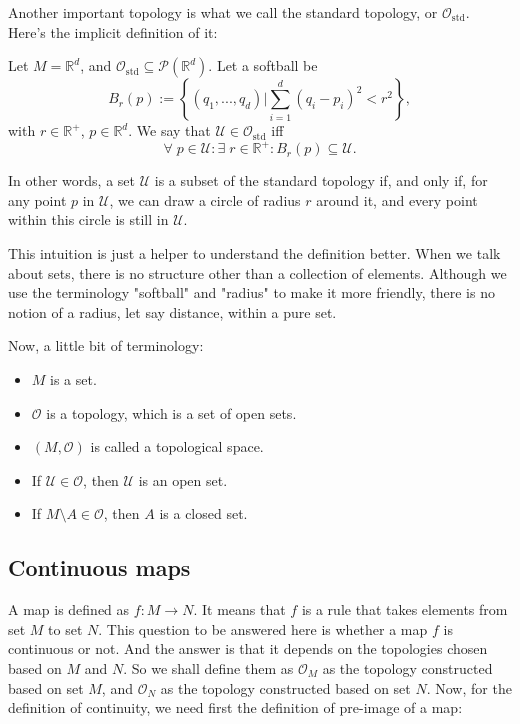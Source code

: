 \begin{example}
    Another important topology is what we call the standard topology, or $\mathcal{O}_{\text{std}}$. Here's the implicit definition of it:

    \begin{definition}
        Let $M = \mathbb{R}^d$, and $\mathcal{O}_{\text{std}} \subseteq \mathcal{P}(\mathbb{R}^d)$. 
        Let a softball be 
        \[
            B_r(p) := \left\{ (q_1, ..., q_d) \Big| \sum_{i=1}^d (q_i - p_i)^2 < r^2 \right\} ,
        \]
        with $r \in \mathbb{R}^+$, $p \in \mathbb{R}^d$. We say that $\mathcal{U} \in \mathcal{O}_{\text{std}}$ iff
        \[
            \forall \; p \in \mathcal{U}: \exists \; r \in \mathbb{R}^+ : B_r (p) \subseteq \mathcal{U}.
        \]
    \end{definition}
    \noindent
    In other words, a set $\mathcal{U}$ is a subset of the standard topology if, and only if, for any point $p$ in $\mathcal{U}$, we can draw a circle of radius $r$ around it, and every point within this circle is still in $\mathcal{U}$.

    \begin{remark}
        This intuition is just a helper to understand the definition better. When we talk about sets, there is no structure other than a collection of elements. Although we use the terminology "softball" and "radius" to make it more friendly, there is no notion of a radius, let say distance, within a pure set.
    \end{remark}
\end{example}

Now, a little bit of terminology:
\begin{itemize}
    \item $M$ is a set.
    \item $\mathcal{O}$ is a topology, which is a set of open sets.
    \item $(M, \mathcal{O})$ is called a topological space.
    \item If $\mathcal{U} \in \mathcal{O}$, then $\mathcal{U}$ is an open set.
    \item If $M \setminus A \in \mathcal{O}$, then $A$ is a closed set.
\end{itemize}

\subsection{Continuous maps}
A map is defined as $f : M \longrightarrow N$. It means that $f$ is a rule that takes elements from set $M$ to set $N$. This question to be answered here is whether a map $f$ is continuous or not. And the answer is that it depends on the topologies chosen based on $M$ and $N$. So we shall define them as $\mathcal{O}_M$ as the topology constructed based on set $M$, and $\mathcal{O}_N$ as the topology constructed based on set $N$. Now, for the definition of continuity, we need first the definition of pre-image of a map:

